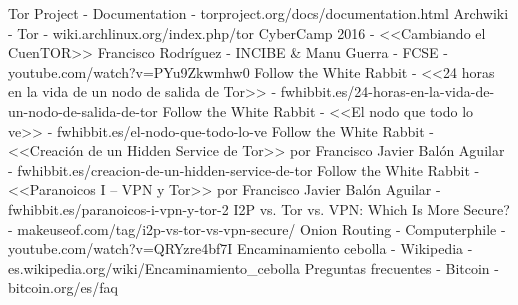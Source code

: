 \documentclass[a4paper, 11pt, titlepage]{article}
\begin{document}
\newpage
\begin{thebibliography}{X}
    \bibitem{} Tor Project - Documentation - torproject.org/docs/documentation.html
    \bibitem{} Archwiki - Tor - wiki.archlinux.org/index.php/tor
    \bibitem{} CyberCamp 2016 - <<Cambiando el CuenTOR>> Francisco Rodríguez - INCIBE \& Manu Guerra - FCSE - youtube.com/watch?v=PYu9Zkwmhw0
    \bibitem{} Follow the White Rabbit - <<24 horas en la vida de un nodo de salida de Tor>> - fwhibbit.es/24-horas-en-la-vida-de-un-nodo-de-salida-de-tor
    \bibitem{} Follow the White Rabbit - <<El nodo que todo lo ve>>  - fwhibbit.es/el-nodo-que-todo-lo-ve
    \bibitem{} Follow the White Rabbit - <<Creación de un Hidden Service de Tor>> por Francisco Javier Balón Aguilar - fwhibbit.es/creacion-de-un-hidden-service-de-tor
    \bibitem{} Follow the White Rabbit - <<Paranoicos I – VPN y Tor>> por Francisco Javier Balón Aguilar - fwhibbit.es/paranoicos-i-vpn-y-tor-2
    \bibitem{} I2P vs. Tor vs. VPN: Which Is More Secure? - makeuseof.com/tag/i2p-vs-tor-vs-vpn-secure/
    \bibitem{} Onion Routing - Computerphile - youtube.com/watch?v=QRYzre4bf7I
    \bibitem{} Encaminamiento cebolla - Wikipedia - es.wikipedia.org/wiki/Encaminamiento\_cebolla
    \bibitem{} Preguntas frecuentes - Bitcoin - bitcoin.org/es/faq
\end{thebibliography}

    
\end{document}
